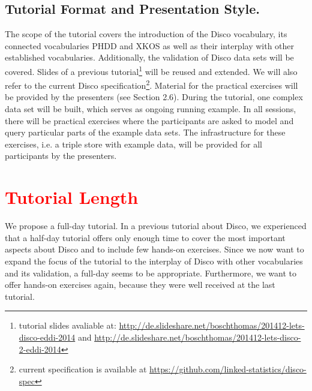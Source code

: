 \documentclass{llncs}
\begin{document}
\subsection{Tutorial Format and Presentation Style.}
The scope of the tutorial covers the introduction of the Disco vocabulary, its connected vocabularies PHDD and XKOS as well as their interplay with other established vocabularies.
Additionally, the validation of Disco data sets will be covered.
Slides of a previous tutorial\footnote{tutorial slides avaliable at: \url{http://de.slideshare.net/boschthomas/201412-lets-disco-eddi-2014} and \url{http://de.slideshare.net/boschthomas/201412-lets-disco-2-eddi-2014}} 
will be reused and extended. We will also refer to the current Disco specification\footnote{current specification is available at \url{https://github.com/linked-statistics/disco-spec}}.
Material for the practical exercises will be provided by the presenters (see Section 2.6).
During the tutorial, one complex data set will be built, which serves as ongoing running example. In all sessions, there will be practical exercises where the participants are asked to model and query particular parts of the example data sets. The infrastructure for these exercises, i.e. a triple store with example data, will be provided for all participants by the presenters.

\section{\textcolor{red}{Tutorial Length}}

We propose a full-day tutorial. In a previous tutorial about Disco, we experienced that a half-day tutorial offers only enough time to cover the most important aspects about Disco and to include few hands-on exercises. Since we now want to expand the focus of the tutorial to the interplay of Disco with other vocabularies and its validation, a full-day seems to be appropriate. Furthermore, we want to offer hands-on exercises again, because they were well received at the last tutorial.
\end{document}
